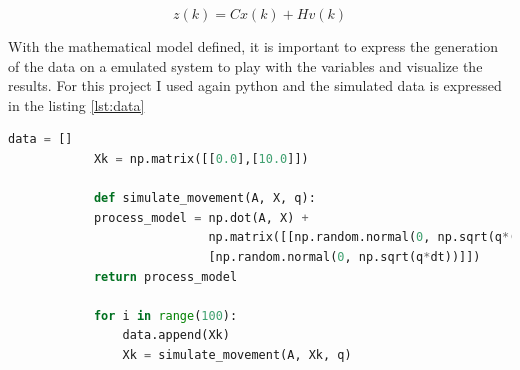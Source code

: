 \documentclass{article}
\begin{document}
        \begin{equation}\label{eq:2}
            z(k) = Cx(k) + Hv(k)
        \end{equation}\label{eq:2}

        With the mathematical model defined, it is important to express the generation of the data on a emulated system
        to play with the variables and visualize the results. For this project I used again python and the simulated data is expressed
        in the listing \ref{lst:data}

        \begin{lstlisting}[language=Python, caption= Prediction Kalman function, label={lst:data}]
            data = []
            Xk = np.matrix([[0.0],[10.0]])

            def simulate_movement(A, X, q):            
            process_model = np.dot(A, X) + 
                            np.matrix([[np.random.normal(0, np.sqrt(q*((dt**3)/3)))], 
                            [np.random.normal(0, np.sqrt(q*dt))]]) 
            return process_model
            
            for i in range(100):
                data.append(Xk)
                Xk = simulate_movement(A, Xk, q)
        \end{lstlisting}

    
\end{document}
